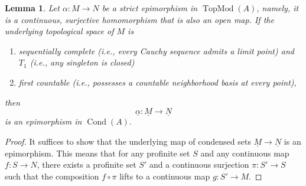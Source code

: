 \documentclass[11pt]{amsart}
\newcommand{\ra}{\rightarrow} %
\newcommand{\TopMod}{\operatorname{TopMod}}
\newcommand{\Cond}{\operatorname{Cond}}
\newcommand{\ul}{\underline}
\theoremstyle{plain}
\newtheorem{lem}[prop]{Lemma}
\theoremstyle{definition}
\numberwithin{equation}{prop}
\begin{document}
\begin{lem}\label{ColimCok}
Let $\alpha:M\ra N$ be a strict epimorphism in $\TopMod(A)$, namely, it is  a continuous, surjective homomorphism that is also an open map.
If the underlying topological space of $M$ is 
\begin{enumerate} 
\item 
sequentially complete (i.e., every Cauchy sequence admits a limit point) and $T_1$ (i.e., any singleton is closed)
\item 
first countable (i.e., possesses a countable neighborhood basis at every point),
\end{enumerate} 
then 
$$\ul\alpha: \ul M\ra \ul N$$
is an epimorphism in $\Cond(A).$
\end{lem}

\begin{proof}
It suffices to show that the underlying map of condensed sets $\ul M \ra \ul N$ is an epimorphism. 
This means that for any profinite set $S$ and any continuous map $f: S \ra N$, 
there exists a profinite set $S'$ and a continuous surjection $\pi: S' \ra S$ 
such that the composition $f \circ \pi$ lifts to a continuous map $g: S' \ra M$.


\end{proof}
\end{document}
